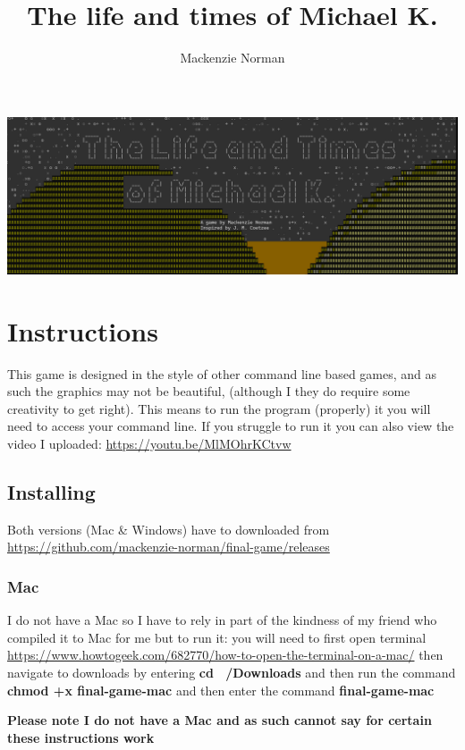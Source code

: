 \documentclass{article}
\title{The life and times of Michael K.}
\author{Mackenzie Norman}
\begin{document}
\maketitle
\begin{center}
    \includegraphics[width=\textwidth]{title_screen.png}
\end{center}
\section*{Instructions}
This game is designed in the style of other command line based games, and as such the graphics may not be beautiful, (although I they do require some creativity to get right). This means to run the program (properly) it you will need to access your command line.
If you struggle to run it you can also view the video I uploaded:  \url{https://youtu.be/MlMOhrKCtvw}
\paragraph{}

\subsection*{Installing}
Both versions (Mac \& Windows) have to downloaded from \url{https://github.com/mackenzie-norman/final-game/releases}
\subsubsection*{Mac}
I do not have a Mac so I have to rely in part of the kindness of my friend who compiled it to Mac for me but to run it: you will need to first open terminal \url{https://www.howtogeek.com/682770/how-to-open-the-terminal-on-a-mac/}
then navigate to downloads by entering \textbf{cd ~/Downloads} and then run the command \textbf{chmod +x final-game-mac} and then enter the command \textbf{final-game-mac} 

\textbf{Please note I do not have a Mac and as such cannot say for certain these instructions work}
\end{document}

